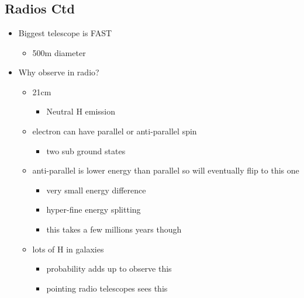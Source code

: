 \documentclass[a4paper,11pt,normalem]{article}
\begin{document}
\section{}
\subsection{Radios Ctd}

\begin{itemize}
    \item Biggest telescope is FAST
        \begin{itemize}
            \item 500m diameter
        \end{itemize}
    \item Why observe in radio?
        \begin{itemize}
            \item 21cm
                \begin{itemize}
                    \item Neutral H emission
                \end{itemize}
            \item electron can have parallel or anti-parallel spin
                \begin{itemize}
                    \item two sub ground states
                \end{itemize}
            \item anti-parallel is lower energy than parallel so will eventually flip to this one
                \begin{itemize}
                    \item very small energy difference
                    \item hyper-fine energy splitting
                    \item this takes a few millions years though
                \end{itemize}
            \item lots of H in galaxies
                \begin{itemize}
                    \item probability adds up to observe this
                    \item pointing radio telescopes sees this
                \end{itemize}
        \end{itemize}
\end{itemize}
\end{document}

